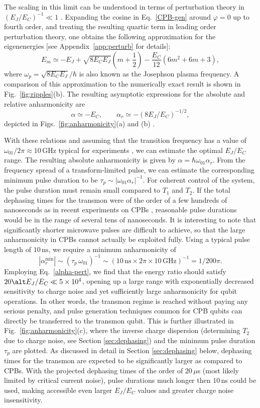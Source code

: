 \documentclass[twocolumn,amsmath,amssymb,floatfix,pra,showpacs,eqsecnum,footinbib,superscriptaddress]{revtex4}
\newcounter{fig}
\newcommand{\abs}[1]{\left|#1\right|}
\newcommand{\be}{\begin{equation}}
\newcommand{\ee}{\end{equation}}
\begin{document}
The scaling in this limit can be understood in terms of  perturbation theory in $(E_J/E_C)^{-1}\ll1$ \cite{footnote2}. Expanding the cosine in Eq.~\eqref{CPB-gen} around $\varphi=0$ up to fourth order, and treating the resulting quartic term in leading order perturbation theory, one obtains the following approximation for the eigenenergies [see Appendix\ \ref{app:perturb} for details]:
\be\label{eigenenergiesas}
E_m\simeq -E_J+\sqrt{8E_CE_J}\left(m+\frac{1}{2}\right) -\frac{E_C}{12}(6m^2+6m+3),
\ee
where $\omega_p=\sqrt{8E_CE_J}/\hbar$ is also known as the Josephson plasma frequency. A comparison of this approximation to the numerically exact result is shown in Fig.\ \ref{fig:ripples}(b).
The resulting asymptotic expressions for the absolute and relative anharmonicity are
\be\label{alpha-pert}
\alpha\simeq -E_C,\qquad
\alpha_r\simeq-(8E_J/E_C)^{-1/2},
\ee
depicted in Figs.\ \ref{fig:anharmonicity}(a) and (b) \cite{footnote3}.

With these relations and assuming that the transition frequency has a value of $\omega_{01}/2\pi\approx 10\,$GHz typical for experiments \cite{wallraff}, we can estimate the optimal $E_J/E_C$ range.  The resulting absolute anharmonicity is given by $\alpha = \hbar\omega_{01}\alpha_r$. From the frequency spread of a transform-limited pulse, we can estimate the corresponding minimum pulse duration to be $\tau_p\sim \abs{\omega_{01}\alpha_r}^{-1}$. For coherent control of the system, the pulse duration must remain small compared to $T_1$ and $T_2$. If the total dephasing times for the transmon were of the order of a few hundreds of nanoseconds as in recent experiments on CPBs \cite{wallraff}, reasonable pulse durations would be in the range of several tens of nanoseconds. It is interesting to note that significantly shorter microwave pulses are difficult to achieve, so that the large anharmonicity in CPBs cannot actually be exploited fully. Using a typical pulse length of $10\,\text{ns}$, we require a minimum anharmonicity of 
\be
\abs{\alpha_r^\text{min}}\sim (\tau_p \,\omega_{01})^{-1} \sim (10\,\text{ns}\times 2\pi\times10\,\text{GHz})^{-1} = 1/200\pi.
\ee
Employing Eq.~\eqref{alpha-pert}, we find that the energy ratio should satisfy $20 \alt E_J/E_C\ll 5\times10^4$, opening up a large range with exponentially decreased sensitivity to charge noise and yet sufficiently large anharmonicity for qubit operations. In other words, the transmon regime is reached without paying any serious penalty, and pulse generation techniques common for CPB qubits can directly be transferred to the transmon qubit. This is further illustrated in Fig.\ \ref{fig:anharmonicity}(c), where the inverse charge dispersion (determining $T_2$ due to charge noise, see Section \ref{sec:dephasing}) and the minimum pulse duration $\tau_p$ are plotted. As discussed in detail in Section \ref{sec:dephasing} below, dephasing times for the transmon are expected to be significantly larger as compared to CPBs. With the projected dephasing times of the order of $20\,\mu$s (most likely limited by critical current noise), pulse durations much longer then $10\,$ns could be used, making accessible even larger $E_J/E_C$ values and greater charge noise insensitivity.
\end{document}
